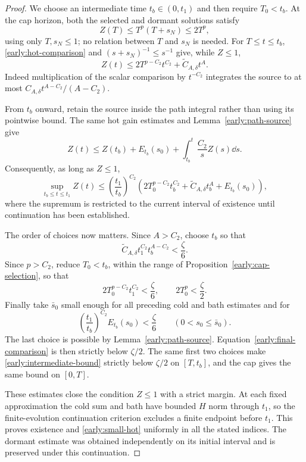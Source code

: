 \begin{proof}
We choose an intermediate time $t_b\in(0,t_1)$ and then require
$T_0<t_b$. At the cap horizon, both the selected and dormant solutions
satisfy
\[
 Z(T)\le T^p(T+s_N)\le2T^p,
\]
using only $T,s_N\le1$; no relation between $T$ and $s_N$ is needed.
For $T\le t\le t_b$, \eqref{early:hot-comparison} and
$(s+s_N)^{-1}\le s^{-1}$ give, while $Z\le1$,
\begin{equation}\label{early:intermediate-bound}
 Z(t)\le2T^{p-C_2}t^{C_2}
                  +\widetilde C_{A,\delta}t^A.
\end{equation}
Indeed multiplication of the scalar comparison by $t^{-C_2}$ integrates
the source to at most
$C_{A,\delta}t^{A-C_2}/(A-C_2)$.

From $t_b$ onward, retain the source inside the path integral rather
than using its pointwise bound. The same hot gain estimates and
Lemma~\ref{early:path-source} give
\[
 Z(t)\le Z(t_b)+E_{t_b}(s_0)
                 +\int_{t_b}^t\frac{C_2}{s}Z(s)\dd s.
\]
Consequently, as long as $Z\le1$,
\begin{equation}\label{early:final-comparison}
 \sup_{t_b\le t\le t_1}Z(t)
 \le\left(\frac{t_1}{t_b}\right)^{C_2}
       \left(2T_0^{p-C_2}t_b^{C_2}
              +\widetilde C_{A,\delta}t_b^A+E_{t_b}(s_0)\right),
\end{equation}
where the supremum is restricted to the current interval of existence
until continuation has been established.

The order of choices now matters. Since $A>C_2$, choose $t_b$ so that
\[
 \widetilde C_{A,\delta}t_1^{C_2}t_b^{A-C_2}<\frac\zeta6.
\]
Since $p>C_2$, reduce $T_0<t_b$, within the range of
Proposition~\ref{early:cap-selection}, so that
\[
 2T_0^{p-C_2}t_1^{C_2}<\frac\zeta6,
 \qquad 2T_0^p<\frac\zeta2.
\]
Finally take $\bar s_0$ small enough for all preceding cold and bath
estimates and for
\[
 \left(\frac{t_1}{t_b}\right)^{C_2}E_{t_b}(s_0)<\frac\zeta6
 \qquad(0<s_0\le\bar s_0).
\]
The last choice is possible by Lemma~\ref{early:path-source}.
Equation~\eqref{early:final-comparison} is then strictly below
$\zeta/2$. The same first two choices make
\eqref{early:intermediate-bound} strictly below $\zeta/2$ on
$[T,t_b]$, and the cap gives the same bound on $[0,T]$.

These estimates close the condition $Z\le1$ with a strict margin.
At each fixed approximation the cold sum and bath have bounded
$H$ norm through $t_1$, so the finite-evolution continuation criterion
excludes a finite endpoint before $t_1$.
This proves existence and \eqref{early:small-hot} uniformly in all the
stated indices. The dormant estimate was obtained independently on its
initial interval and is preserved under this continuation.
\end{proof}
